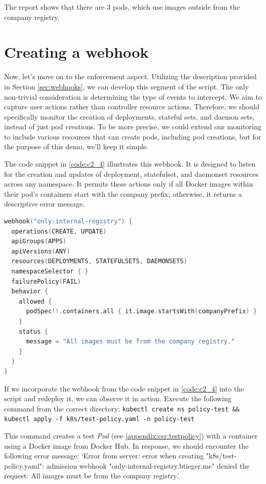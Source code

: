 The report shows that there are 3 pods, which use images outside from the company registry.

\clearpage
\section{Creating a webhook}

Now, let's move on to the enforcement aspect. Utilizing the description provided in Section \ref{sec:webhooks}, we can develop this segment of the script. The only non-trivial consideration is determining the type of events to intercept. We aim to capture user actions rather than controller resource actions. Therefore, we should specifically monitor the creation of deployments, stateful sets, and daemon sets, instead of just pod creations. To be more precise, we could extend our monitoring to include various resources that can create pods, including pod creations, but for the purpose of this demo, we'll keep it simple.

The code snippet in \ref{code:c2_4} illustrates this webhook. It is designed to listen for the creation and updates of deployment, statefulset, and daemonset resources across any namespace. It permits these actions only if all Docker images within their pod's containers start with the company prefix; otherwise, it returns a descriptive error message.

\begin{lstlisting}[caption={Company policy enforcer webhook},language=Kotlin,label=code:c2_4]
webhook("only-internal-registry") {
  operations(CREATE, UPDATE)
  apiGroups(APPS)
  apiVersions(ANY)
  resources(DEPLOYMENTS, STATEFULSETS, DAEMONSETS)
  namespaceSelector { }
  failurePolicy(FAIL)
  behavior {
    allowed {
      podSpec!!.containers.all { it.image.startsWith(companyPrefix) }
    }
    status {
      message = "All images must be from the company registry."
    }
  }
}
\end{lstlisting}

If we incorporate the webhook from the code snippet in \ref{code:c2_4} into the script and redeploy it, we can observe it in action. Execute the following command from the correct directory: \lstinline|kubectl create ns policy-test && kubectl apply -f k8s/test-policy.yaml -n policy-test|

This command creates a test \emph{Pod} (see \ref{appendix:csr:testpolicy}) with a container using a Docker image from Docker Hub. In response, we should encounter the following error message: `Error from server: error when creating "k8s/test-policy.yaml": admission webhook "only-internal-registry.btieger.me" denied the request: All images must be from the company registry.'

